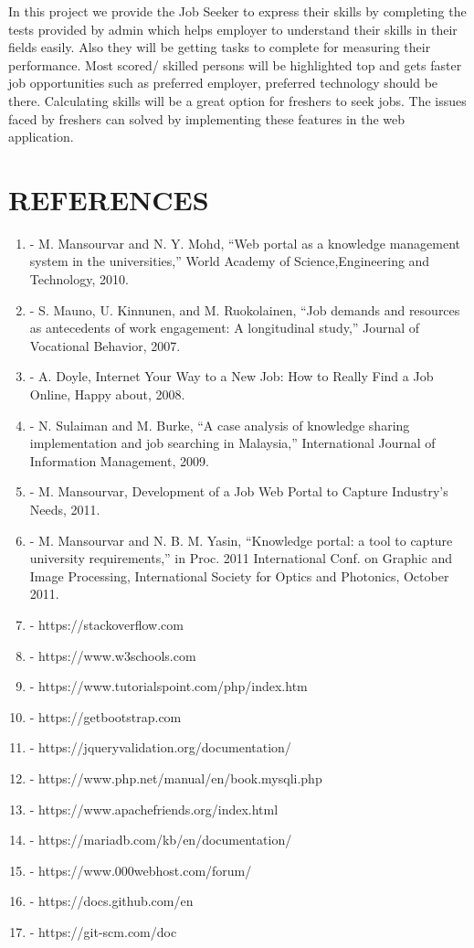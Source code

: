 \documentclass[a4paper,12pt]{report}
\begin{document}
In this project we provide the Job Seeker to express their skills by completing the tests provided by admin which helps employer to understand their skills in their fields easily. Also they will be getting tasks to complete for measuring their performance. Most scored/ skilled persons will be highlighted top and gets faster job opportunities such as preferred employer, preferred technology should be there. Calculating skills will be a great option for freshers to seek jobs. The issues faced by freshers can solved by implementing these features in the web application.

\pagebreak

\chapter{REFERENCES}

\begin{enumerate}
\item - M. Mansourvar and N. Y. Mohd, “Web portal as a knowledge management system in the universities,” World Academy of Science,Engineering and Technology, 2010.
\item - S. Mauno, U. Kinnunen, and M. Ruokolainen, “Job demands and resources as antecedents of work engagement: A longitudinal study,” Journal of Vocational Behavior, 2007.
\item - A. Doyle, Internet Your Way to a New Job: How to Really Find a Job Online, Happy about, 2008.
\item - N. Sulaiman and M. Burke, “A case analysis of knowledge sharing implementation and job searching in Malaysia,” International Journal of Information Management, 2009.
\item - M. Mansourvar, Development of a Job Web Portal to Capture Industry’s Needs, 2011.
\item - M. Mansourvar and N. B. M. Yasin, “Knowledge portal: a tool to capture university requirements,” in Proc. 2011 International Conf. on Graphic and Image Processing, International Society for Optics and Photonics, October 2011.

	\item - https://stackoverflow.com
	\item - https://www.w3schools.com
	\item - https://www.tutorialspoint.com/php/index.htm
	\item - https://getbootstrap.com
	\item - https://jqueryvalidation.org/documentation/
	\item - https://www.php.net/manual/en/book.mysqli.php
	\item - https://www.apachefriends.org/index.html
	\item -	https://mariadb.com/kb/en/documentation/
	\item -	https://www.000webhost.com/forum/
	\item -	https://docs.github.com/en
	\item -	https://git-scm.com/doc
\end{enumerate} 
\pagebreak
\end{document}
